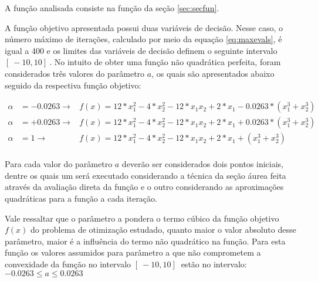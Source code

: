 
A função analisada consiste na função da seção \ref{sec:secfun}.

A função objetivo apresentada possui duas variáveis de decisão. Nesse caso, o número máximo de iterações, calculado por meio da equação \ref{eq:maxevals}, é igual a 400 e os limites das variáveis de decisão definem o seguinte intervalo $[\ -10 , 10 ]\ $. No intuito de obter uma função não quadrática perfeita, foram considerados três valores do parâmetro $a$, os quais são apresentados abaixo seguido da respectiva função objetivo:

\begin{equation*}   
    \begin{aligned}
        \alpha &=-0.0263 \rightarrow &f(x) = 12*x_1^2 - 4*x_2^2 - 12*x_1x_2 + 2*x_1 -0.0263*(x_1^3+x_2^3)\\
        \alpha &=+0.0263 \rightarrow &f(x) = 12*x_1^2 - 4*x_2^2 - 12*x_1x_2 + 2*x_1 + 0.0263*(x_1^3+x_2^3)\\
        \alpha &=1 \rightarrow &f(x) = 12*x_1^2 - 4*x_2^2 - 12*x_1x_2 + 2*x_1 + (x_1^3+x_2^3)\\   
    \end{aligned}
\end{equation*}

Para cada valor do parâmetro $a$ deverão ser considerados dois pontos iniciais, dentre os quais um será executado considerando a técnica da seção áurea feita através da avaliação direta da função e o outro considerando as aproximações quadráticas para a função a cada iteração.

Vale ressaltar que o parâmetro a pondera o termo cúbico da função objetivo $f(x)$ do problema de otimização estudado, quanto maior o valor absoluto desse parâmetro, maior é a influência do termo não quadrático na função. Para esta função os valores assumidos para parâmetro  a que não comprometem a convexidade da função   no intervalo $[\ -10 , 10 ]\ $ estão no intervalo: \\ {\centering $-0.0263 \leq a \leq 0.0263$} \\
\vspace{2mm}